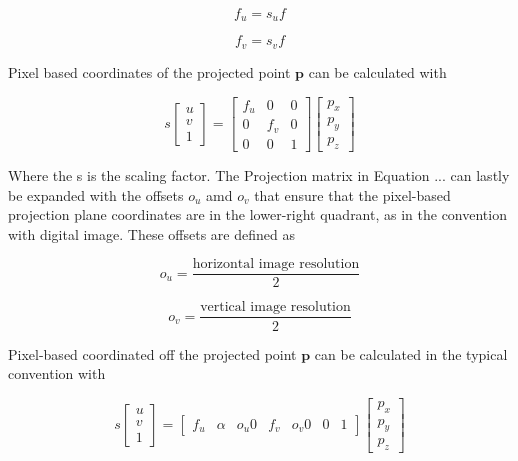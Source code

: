 \begin{equation}
    f_u = s_uf
\end{equation}

\begin{equation}
    f_v =s_vf
\end{equation}

Pixel based coordinates of the projected point $\mathbf{p}$ can be calculated with

\begin{equation}
    s
    \begin{bmatrix}
    u \\
    v \\
    1    
    \end{bmatrix}
    =
    \begin{bmatrix}
        f_u & 0 & 0 \\
        0 & f_v & 0 \\
        0 & 0 & 1
    \end{bmatrix}
    \begin{bmatrix}
        p_x \\ 
        p_y \\
        p_z
    \end{bmatrix}
\end{equation}

Where the s is the scaling factor. The Projection matrix in Equation ... can lastly be expanded with the offsets $o_u$ amd $o_v$ that ensure that the pixel-based
projection plane coordinates are in the lower-right quadrant, as in the convention with digital image. These offsets are defined as

\begin{equation}
    o_u = \frac{\text{horizontal image resolution}}{2}
\end{equation}

\begin{equation}
    o_v = \frac{\text{vertical image resolution}}{2}
\end{equation}

Pixel-based coordinated off the projected point $\mathbf{p}$ can be calculated in the typical convention with

\begin{equation}
    s
    \begin{bmatrix}
        u \\
        v \\
        1
    \end{bmatrix}
    =
    \begin{bmatrix}
    f_u & \alpha & o_u
    0 & f_v & o_v
    0 & 0 & 1
    \end{bmatrix}
    \begin{bmatrix}
        p_x \\
        p_y \\
        p_z
    \end{bmatrix}
\end{equation}

